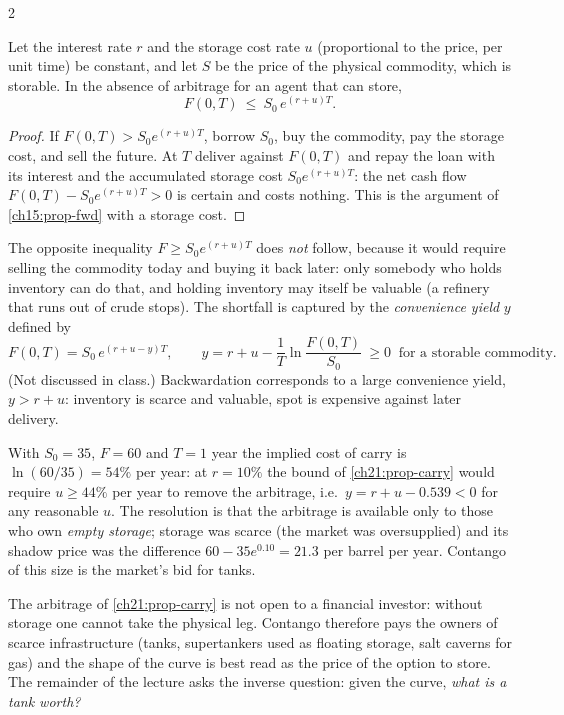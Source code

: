 \begin{paracol}{2}
\begin{proposition}\label{ch21:prop-carry}
Let the interest rate $r$ and the storage cost rate $u$ (proportional to the price, per unit time) be constant, and let $S$ be the price of the physical commodity, which is
storable. In the absence of arbitrage for an agent that can store,
\[
  F(0,T)\ \le\ S_0\,e^{(r+u)T}.
\]
\end{proposition}
\begin{proof}
If $F(0,T)>S_0e^{(r+u)T}$, borrow $S_0$, buy the commodity, pay the storage cost, and sell the future. At $T$ deliver against $F(0,T)$ and repay the loan with its interest
and the accumulated storage cost $S_0e^{(r+u)T}$: the net cash flow $F(0,T)-S_0e^{(r+u)T}>0$ is certain and costs nothing. This is the argument of \cref{ch15:prop-fwd} with a storage cost.
\end{proof}
The opposite inequality $F\ge S_0e^{(r+u)T}$ does \emph{not} follow, because it would require selling the commodity today and buying it back later: only somebody who holds inventory can do that,
and holding inventory may itself be valuable (a refinery that runs out of crude stops). The shortfall is captured by the \emph{convenience yield} $y$ defined by
\begin{equation}\label{ch21:eq-convenience}
  F(0,T)=S_0\,e^{(r+u-y)T},\qquad y=r+u-\frac1T\ln\frac{F(0,T)}{S_0}\ \ge 0\ \text{ for a storable commodity.}
\end{equation}
(Not discussed in class.) Backwardation corresponds to a large convenience yield, $y>r+u$: inventory is scarce and valuable, spot is expensive against later delivery.

\begin{example}\label{ch21:ex-implied}
With $S_0=35$, $F=60$ and $T=1$ year the implied cost of carry is $\ln(60/35)=54\%$ per year: at $r=10\%$ the bound of \cref{ch21:prop-carry} would require $u\ge44\%$ per year to remove the
arbitrage, i.e.\ $y=r+u-0.539<0$ for any reasonable $u$. The resolution is that the arbitrage is available only to those who own \emph{empty storage}; storage was scarce
(the market was oversupplied) and its shadow price was the difference $60-35e^{0.10}=21.3$ per barrel per year. Contango of this size is the market's bid for tanks.
\end{example}

\begin{finance}
The arbitrage of \cref{ch21:prop-carry} is not open to a financial investor: without storage one cannot take the physical leg. Contango therefore pays the owners of scarce
infrastructure (tanks, supertankers used as floating storage, salt caverns for gas) and the shape of the curve is best read as the price of the option to store. The remainder
of the lecture asks the inverse question: given the curve, \emph{what is a tank worth?}
\end{finance}


\end{paracol}
